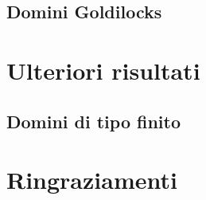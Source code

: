 \documentclass{article}
\begin{document}
\subsection{Domini Goldilocks}

%
%

\newpage

\section{Ulteriori risultati} \label{Ulteriori risultati}
\subsection{Domini di tipo finito}

%

\newpage



\newpage

\section*{Ringraziamenti}

\end{document}
